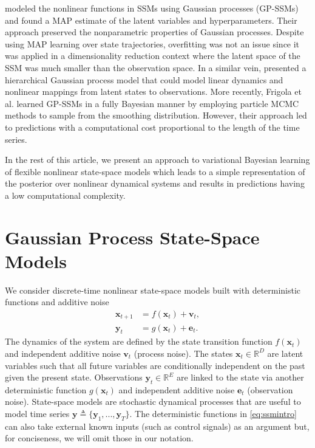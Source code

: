 \documentclass{article} %
\newcommand{\n}[1]{\mathbf{#1}}
\newcommand{\x}{\mathbf{x}}
\newcommand{\y}{\mathbf{y}}
\begin{document}
\citet{Wang2006} modeled the nonlinear functions in SSMs using Gaussian processes (GP-SSMs) and found a MAP estimate of the latent variables and hyperparameters. Their approach preserved the nonparametric properties of Gaussian processes. Despite using MAP learning over state trajectories, overfitting was not an issue since it was applied in a dimensionality reduction context where the latent space of the SSM was much smaller than the observation space. In a similar vein, \citep{Damianou2011,Lawrence2007} presented a hierarchical Gaussian process model that could model linear dynamics and nonlinear mappings from latent states to observations. More recently, Frigola et al. \citep{FriLinSchRas13} learned GP-SSMs in a fully Bayesian manner by employing particle MCMC methods to sample from the smoothing distribution. However, their approach led to predictions with a computational cost proportional to the length of the time series.

In the rest of this article, we present an approach to variational Bayesian learning of flexible nonlinear state-space models which leads to a simple representation of the posterior over nonlinear dynamical systems and results in predictions having a low computational complexity.







\section{Gaussian Process State-Space Models}
\label{sec:gpssm}



We consider discrete-time nonlinear state-space models built with deterministic functions and additive noise
\vspace{-3mm}
\begin{subequations}
  \label{eq:ssmintro}
  \begin{align}
    \label{eq:ssmintroa}
    \x_{t+1} &= f(\x_{t}) + \n{v}_{t}, \\%
    \label{eq:ssmintrob}
    \n{y}_{t} &= g(\x_{t}) + \n{e}_{t}.
  \end{align}
\end{subequations}
The dynamics of the system are defined by the state transition function $f(\x_{t})$ and independent additive noise $\n{v}_{t}$ (process noise). The states $\x_t \in \mathbb{R}^D$ are latent variables such that all future variables are conditionally independent on the past given the present state.  Observations $\y_t \in \mathbb{R}^E$ are linked to the state via another deterministic function $g(\x_t)$ and independent additive noise $\n{e}_{t}$ (observation noise). State-space models are stochastic dynamical processes that are useful to model time series $\y \triangleq\{\y_1,...,\y_T\}$. The deterministic functions in \eqref{eq:ssmintro} can also take external known inputs (such as control signals) as an argument but, for conciseness, we will omit those in our notation.
\end{document}
